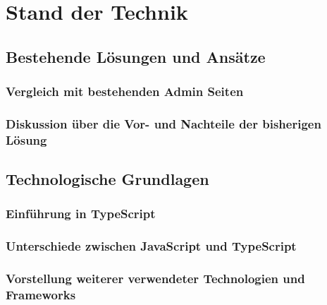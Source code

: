 \section{Stand der Technik}
\subsection[Bestehende Lösungen und Ansätze]{Bestehende Lösungen und Ansätze}

\subsubsection[Vergleich mit bestehenden Admin Seiten]{Vergleich mit bestehenden Admin Seiten}

\subsubsection[Diskussion über die Vor- und Nachteile der bisherigen Lösung]{Diskussion über die Vor- und Nachteile der bisherigen Lösung}



\subsection[Technologische Grundlagen]{Technologische Grundlagen}
\subsubsection[Einführung in TypeScript]{Einführung in TypeScript}

\subsubsection[Unterschiede zwischen JavaScript und TypeScript]{Unterschiede zwischen JavaScript und TypeScript}

\subsubsection[Vorstellung weiterer verwendeter Technologien und Frameworks]{Vorstellung weiterer verwendeter Technologien und Frameworks}